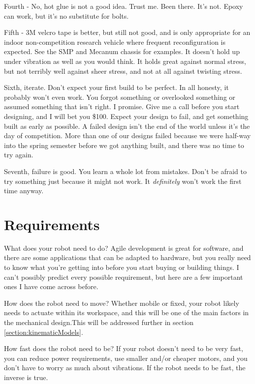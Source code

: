 Fourth - No, hot glue is not a good idea. Trust me. Been there. It's not. Epoxy can work, but it's no substitute for bolts.

Fifth - 3M velcro tape is better, but still not good, and is only appropriate for an indoor non-competition research vehicle where frequent reconfiguration is expected. See the SMP and Mecanum chassis for examples. It doesn't hold up under vibration as well as you would think. It holds great against normal stress, but not terribly well against sheer stress, and not at all against twisting stress.

Sixth, iterate. Don't expect your first build to be perfect. In all honesty, it probably won't even work. You forgot something or overlooked something or assumed something that isn't right. I promise. Give me a call before you start designing, and I will bet you \$100. Expect your design to fail, and get something built as early as possible. A failed design isn't the end of the world unless it's the day of competition. More than one of our designs failed because we were half-way into the spring semester before we got anything built, and there was no time to try again.

Seventh, failure is good. You learn a whole lot from mistakes. Don't be afraid to try something just because it might not work. It \textit{definitely} won't work the first time anyway.

\section{Requirements}

What does your robot need to do? Agile development is great for software, and there are some applications that can be adapted to hardware, but you really need to know what you're getting into before you start buying or building things. I can't possibly predict every possible requirement, but here are a few important ones I have come across before.

How does the robot need to move? Whether mobile or fixed, your robot likely needs to actuate within its workspace, and this will be one of the main factors in the mechanical design.This will be addressed further in section \ref{section:kinematicModels}.

How fast does the robot need to be? If your robot doesn't need to be very fast, you can reduce power requirements, use smaller and/or cheaper motors, and you don't have to worry as much about vibrations. If the robot needs to be fast, the inverse is true.

